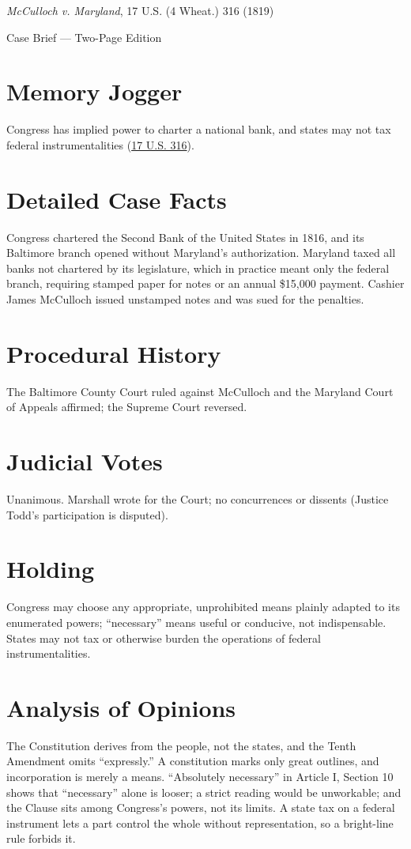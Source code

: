 \documentclass[12pt]{article}
\begin{document}
\begin{center}
{\LARGE \textit{McCulloch v. Maryland}, 17 U.S. (4 Wheat.) 316 (1819)\par}
\vspace{0.5em}
{\large Case Brief --- Two-Page Edition\par}
\end{center}

\section{Memory Jogger}
Congress has implied power to charter a national bank, and states may not tax federal instrumentalities (\href{https://supreme.justia.com/cases/federal/us/17/316/}{17 U.S. 316}).

\section{Detailed Case Facts}
Congress chartered the Second Bank of the United States in 1816, and its Baltimore branch opened without Maryland's authorization. Maryland taxed all banks not chartered by its legislature, which in practice meant only the federal branch, requiring stamped paper for notes or an annual \$15,000 payment. Cashier James McCulloch issued unstamped notes and was sued for the penalties.

\section{Procedural History}
The Baltimore County Court ruled against McCulloch and the Maryland Court of Appeals affirmed; the Supreme Court reversed.

\section{Judicial Votes}
Unanimous. Marshall wrote for the Court; no concurrences or dissents (Justice Todd's participation is disputed).

\section{Holding}
Congress may choose any appropriate, unprohibited means plainly adapted to its enumerated powers; ``necessary'' means useful or conducive, not indispensable. States may not tax or otherwise burden the operations of federal instrumentalities.

\section{Analysis of Opinions}
The Constitution derives from the people, not the states, and the Tenth Amendment omits ``expressly.'' A constitution marks only great outlines, and incorporation is merely a means. ``Absolutely necessary'' in Article I, Section 10 shows that ``necessary'' alone is looser; a strict reading would be unworkable; and the Clause sits among Congress's powers, not its limits. A state tax on a federal instrument lets a part control the whole without representation, so a bright-line rule forbids it.
\end{document}
